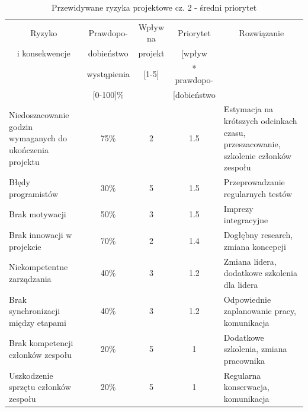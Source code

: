 \documentclass[a4paper,11pt]{article}
\begin{document}
\begin{table}[H]
	\centering
	\caption{Przewidywane ryzyka projektowe cz. 2 - średni priorytet}
	\bgroup
	\begin{tabular}{|p{5cm}|c|c|c|p{5cm}|}
	\hline
	\multicolumn{1}{|c|}{Ryzyko} & \multicolumn{1}{c|}{Prawdopo-} & \multicolumn{1}{c|}{Wpływ na} & \multicolumn{1}{c|}{Priorytet } & \multicolumn{1}{c|}{Rozwiązanie} \\
	\multicolumn{1}{|c|}{i konsekwencje} & \multicolumn{1}{c|}{dobieństwo} & \multicolumn{1}{c|}{projekt} & \multicolumn{1}{c|}{[wpływ} &  \\
	\multicolumn{1}{|c|}{} & \multicolumn{1}{c|}{wystąpienia} & \multicolumn{1}{c|}{[1-5]} & \multicolumn{1}{c|}{* prawdopo-} & \multicolumn{1}{c|}{} \\
	\multicolumn{1}{|c|}{} & \multicolumn{1}{c|}{[0-100]\%} & \multicolumn{1}{c|}{} & \multicolumn{1}{c|}{[dobieństwo} &  \\ \hline \hline
		
		Niedoszacowanie godzin wymaganych do ukończenia projektu & 75\% & 2 & 1.5 & Estymacja na krótszych odcinkach czasu, przeszacowanie, szkolenie członków zespołu
		\\ \hline
		Błędy programistów & 30\% & 5 & 1.5 & Przeprowadzanie regularnych testów
		\\ \hline
		Brak motywacji & 50\% & 3 & 1.5 & Imprezy integracyjne
		\\ \hline
		Brak innowacji w projekcie & 70\% & 2 & 1.4 & Dogłębny research, zmiana koncepcji
		\\ \hline
		Niekompetentne zarządzania & 40\% & 3 & 1.2 & Zmiana lidera, dodatkowe szkolenia dla lidera
		\\ \hline
		Brak synchronizacji między etapami & 40\% & 3 & 1.2 & Odpowiednie zaplanowanie pracy, komunikacja
		\\ \hline
		Brak kompetencji członków zespołu & 20\% & 5 & 1 & Dodatkowe szkolenia, zmiana pracownika
		\\ \hline
		Uszkodzenie sprzętu członków zespołu & 20\% & 5 & 1 & Regularna konserwacja, komunikacja
		\\ \hline

		
		
		
		
		
	\end{tabular}
	\egroup
\end{table}
\end{document}
